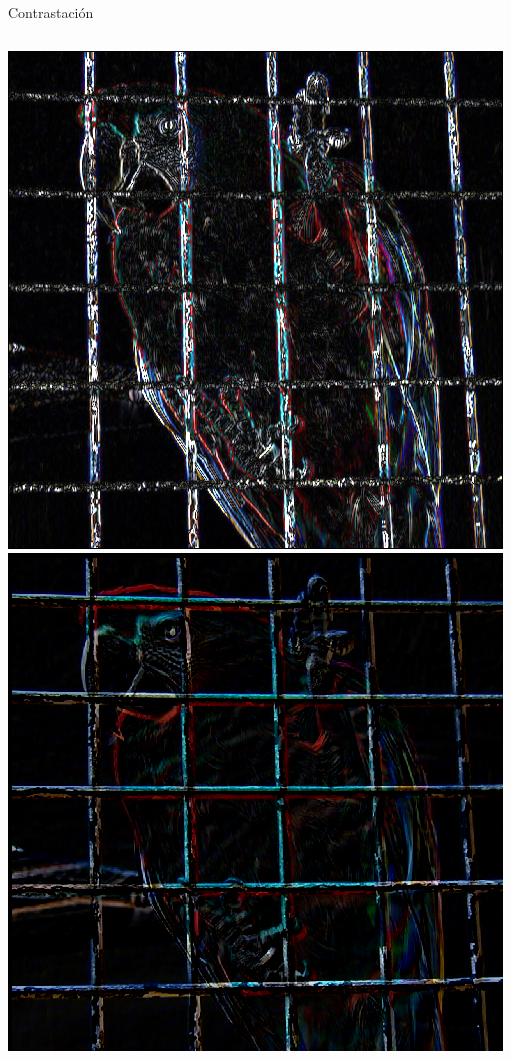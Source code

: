\documentclass{beamer}
\begin{document}
\begin{frame}{Contrastación}
\begin{columns}
\column[t]{5cm}

\includegraphics[scale=0.18]{./.Presentation/parrot_EW} \\
\includegraphics[scale=0.18]{./.Presentation/parrot_displaced2}

\end{columns}
\end{frame}
\end{document}
